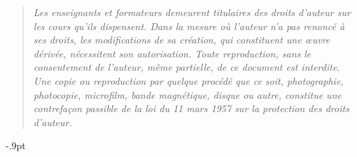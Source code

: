    \vspace {12cm}

   \begin {quote}
   \em Les enseignants et formateurs demeurent titulaires des droits d'auteur sur les cours qu'ils dispensent.    
Dans la mesure où l'auteur n'a pas renoncé à ses droits, les modifications de sa création, qui constituent une œuvre dérivée, nécessitent son autorisation. 
    Toute  reproduction,  sans le consentement de l'auteur, 
    même  partielle,  de ce document est
    interdite.  Une copie ou reproduction  par quelque procédé que
    ce   soit,   photographie,    photocopie,   microfilm,   bande
    magnétique,   disque  ou  autre,   constitue  une  contrefaçon
   passible  de la loi du 11  mars  1957  sur la  protection  des
    droits d'auteur.
    \end {quote}
\newpage

\setcounter{page}{1}


\begingroup
\baselineskip\dimexpr\baselineskip-.9pt\relax
\tableofcontents
\endgroup


\newpage
~ %
\newpage


%

%




%

